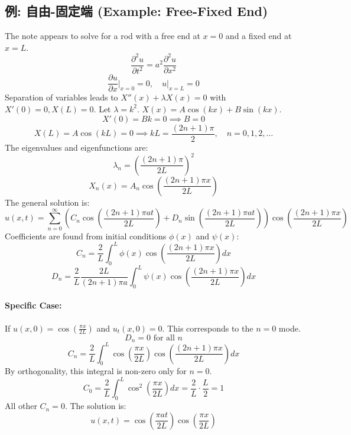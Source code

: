 \documentclass{article}
\begin{document}
	\subsection*{例: 自由-固定端 (Example: Free-Fixed End)}
	The note appears to solve for a rod with a free end at $x=0$ and a fixed end at $x=L$.
	$$ \frac{\partial^2 u}{\partial t^2} = a^2 \frac{\partial^2 u}{\partial x^2} $$
	$$ \frac{\partial u}{\partial x}\bigg|_{x=0}=0, \quad u|_{x=L}=0 $$
	Separation of variables leads to $X''(x)+\lambda X(x)=0$ with $X'(0)=0, X(L)=0$.
	Let $\lambda=k^2$. $X(x)=A\cos(kx)+B\sin(kx)$.
	$$ X'(0) = B k = 0 \implies B=0 $$
	$$ X(L) = A\cos(kL) = 0 \implies kL = \frac{(2n+1)\pi}{2}, \quad n=0, 1, 2, \dots $$
	The eigenvalues and eigenfunctions are:
	$$ \lambda_n = \left(\frac{(2n+1)\pi}{2L}\right)^2 $$
	$$ X_n(x) = A_n \cos\left(\frac{(2n+1)\pi x}{2L}\right) $$
	The general solution is:
	$$ u(x,t) = \sum_{n=0}^{\infty} \left(C_n \cos\left(\frac{(2n+1)\pi a t}{2L}\right) + D_n \sin\left(\frac{(2n+1)\pi a t}{2L}\right)\right) \cos\left(\frac{(2n+1)\pi x}{2L}\right) $$
	Coefficients are found from initial conditions $\phi(x)$ and $\psi(x)$:
	$$ C_n = \frac{2}{L} \int_0^L \phi(x) \cos\left(\frac{(2n+1)\pi x}{2L}\right) dx $$
	$$ D_n = \frac{2}{L} \frac{2L}{(2n+1)\pi a} \int_0^L \psi(x) \cos\left(\frac{(2n+1)\pi x}{2L}\right) dx $$
	\paragraph{Specific Case:} If $u(x,0) = \cos(\frac{\pi x}{2L})$ and $u_t(x,0)=0$.
	This corresponds to the $n=0$ mode.
	$$ D_n = 0 \text{ for all } n $$
	$$ C_n = \frac{2}{L} \int_0^L \cos\left(\frac{\pi x}{2L}\right) \cos\left(\frac{(2n+1)\pi x}{2L}\right) dx $$
	By orthogonality, this integral is non-zero only for $n=0$.
	$$ C_0 = \frac{2}{L} \int_0^L \cos^2\left(\frac{\pi x}{2L}\right) dx = \frac{2}{L} \cdot \frac{L}{2} = 1 $$
	All other $C_n=0$. The solution is:
	$$ u(x,t) = \cos\left(\frac{\pi a t}{2L}\right) \cos\left(\frac{\pi x}{2L}\right) $$
	
\end{document}
